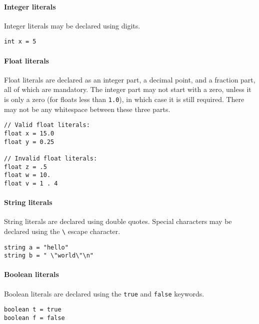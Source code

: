 \paragraph{Integer literals}\label{integer-literals}

Integer literals may be declared using digits.

\begin{verbatim}
int x = 5
\end{verbatim}

\paragraph{Float literals}\label{float-literals}

Float literals are declared as an integer part, a decimal point, and a
fraction part, all of which are mandatory. The integer part may not
start with a zero, unless it is only a zero (for floats less than
\texttt{1.0}), in which case it is still required. There may not be any
whitespace between these three parts.

\begin{verbatim}
// Valid float literals:
float x = 15.0
float y = 0.25

// Invalid float literals:
float z = .5
float w = 10.
float v = 1 . 4
\end{verbatim}

\paragraph{String literals}\label{string-literals}

String literals are declared using double quotes. Special characters may
be declared using the \texttt{\textbackslash{}} escape character.

\begin{verbatim}
string a = "hello"
string b = " \"world\"\n"
\end{verbatim}

\paragraph{Boolean literals}\label{boolean-literals}

Boolean literals are declared using the \texttt{true} and \texttt{false}
keywords.

\begin{verbatim}
boolean t = true
boolean f = false
\end{verbatim}


